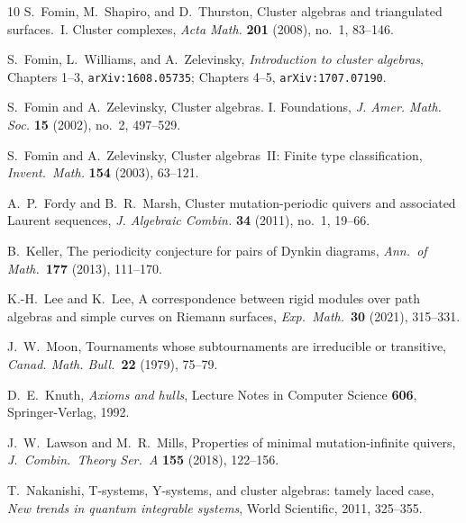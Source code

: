 \documentclass[11pt, letterpaper]{amsart}
\theoremstyle{definition}
\numberwithin{equation}{section}
\begin{document}
\begin{thebibliography}{10}
S.~Fomin, M.~Shapiro, and D.~Thurston, %
Cluster algebras and triangulated surfaces.~{I}. {C}luster complexes, 
\textsl{Acta Math.} \textbf{201}
  (2008), no.~1, 83--146. %

S.~Fomin, L.~Williams, and A.~Zelevinsky, %
\emph{Introduction to  cluster algebras}, Chapters 1--3, \texttt{arXiv:1608.05735};
  Chapters 4--5, \texttt{arXiv:1707.07190}. 

S.~Fomin and A.~Zelevinsky, %
Cluster algebras. {I}.  {F}oundations, 
\textsl{J. Amer. Math. Soc.} \textbf{15} (2002), no.~2, 497--529.
  
S.~Fomin and A.~Zelevinsky, %
Cluster algebras~II: Finite type classification, 
\textsl{Invent.\ Math.} \textbf{154} (2003), 63--121. 

A.~P.~Fordy and B.~R.~Marsh, %
Cluster mutation-periodic quivers and associated {L}aurent sequences, 
\textsl{J. Algebraic Combin.} \textbf{34} (2011),
  no.~1, 19--66. %
  
B.~Keller,
The periodicity conjecture for pairs of Dynkin diagrams, 
\textsl{Ann.\ of Math.}\ \textbf{177} (2013), 111--170. 

K.-H.~Lee and K.~Lee, 
A correspondence between rigid modules over path algebras and simple curves on Riemann surfaces, 
\textsl{Exp.\ Math.}\ \textbf{30} (2021), 315--331. 

J.~W.~Moon, 
Tournaments whose subtournaments are irreducible or transitive, 
\textsl{Canad. Math. Bull.}\ \textbf{22} (1979), 75--79. 

D.~E.~Knuth, %
\emph{Axioms and hulls}, 
Lecture Notes in Computer Science \textbf{606}, Springer-Verlag, 1992. %

J.~W.~Lawson and M.~R.~Mills, %
Properties of minimal mutation-infinite quivers, \textsl{J.~Combin.\ Theory Ser.~A} \textbf{155} (2018),
  122--156. %

T.~Nakanishi, %
T-systems, {Y}-systems, and cluster algebras: tamely laced case, 
\emph{New trends in quantum integrable systems}, World Scientific, 2011, 325--355. %


\end{thebibliography}
\end{document}
